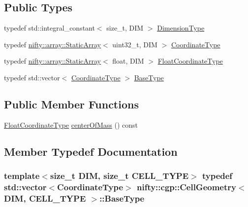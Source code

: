 \subsection*{Public Types}
\begin{DoxyCompactItemize}
\item 
typedef std\+::integral\+\_\+constant$<$ size\+\_\+t, D\+I\+M $>$ \hyperlink{classnifty_1_1cgp_1_1CellGeometry_a8cc75c7033c03864e099a5d907de88d8}{Dimension\+Type}
\item 
typedef \hyperlink{namespacenifty_1_1array_a683f151f19c851754e0c6d55ed16a0c2}{nifty\+::array\+::\+Static\+Array}$<$ uint32\+\_\+t, D\+I\+M $>$ \hyperlink{classnifty_1_1cgp_1_1CellGeometry_af8ae7d6b7a8f20afae6ce53e88604acf}{Coordinate\+Type}
\item 
typedef \hyperlink{namespacenifty_1_1array_a683f151f19c851754e0c6d55ed16a0c2}{nifty\+::array\+::\+Static\+Array}$<$ float, D\+I\+M $>$ \hyperlink{classnifty_1_1cgp_1_1CellGeometry_a07e98f74f6dc5cda1aab1349c7f60d5b}{Float\+Coordinate\+Type}
\item 
typedef std\+::vector$<$ \hyperlink{classnifty_1_1cgp_1_1CellGeometry_af8ae7d6b7a8f20afae6ce53e88604acf}{Coordinate\+Type} $>$ \hyperlink{classnifty_1_1cgp_1_1CellGeometry_ada76b5372b0e456edf3496813b9ed7f0}{Base\+Type}
\end{DoxyCompactItemize}
\subsection*{Public Member Functions}
\begin{DoxyCompactItemize}
\item 
\hyperlink{classnifty_1_1cgp_1_1CellGeometry_a07e98f74f6dc5cda1aab1349c7f60d5b}{Float\+Coordinate\+Type} \hyperlink{classnifty_1_1cgp_1_1CellGeometry_af51fef28bad6333d7604a160e5353188}{center\+Of\+Mass} () const 
\end{DoxyCompactItemize}


\subsection{Member Typedef Documentation}
\hypertarget{classnifty_1_1cgp_1_1CellGeometry_ada76b5372b0e456edf3496813b9ed7f0}{}
\subsubsection[{Base\+Type}]{\setlength{\rightskip}{0pt plus 5cm}template$<$size\+\_\+t D\+I\+M, size\+\_\+t C\+E\+L\+L\+\_\+\+T\+Y\+P\+E$>$ typedef std\+::vector$<${\bf Coordinate\+Type}$>$ {\bf nifty\+::cgp\+::\+Cell\+Geometry}$<$ D\+I\+M, C\+E\+L\+L\+\_\+\+T\+Y\+P\+E $>$\+::{\bf Base\+Type}}\label{classnifty_1_1cgp_1_1CellGeometry_ada76b5372b0e456edf3496813b9ed7f0}
\hypertarget{classnifty_1_1cgp_1_1CellGeometry_af8ae7d6b7a8f20afae6ce53e88604acf}{}
